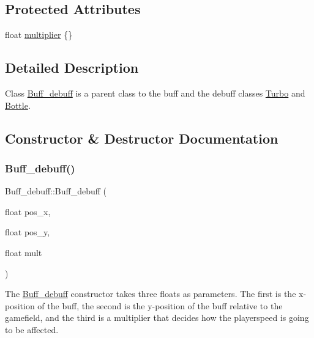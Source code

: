 \subsection*{Protected Attributes}
\begin{DoxyCompactItemize}
\item 
float \hyperlink{classBuff__debuff_a0be49a0b6f19cb7cc160edad75109187}{multiplier} \{\}
\end{DoxyCompactItemize}


\subsection{Detailed Description}
Class \hyperlink{classBuff__debuff}{Buff\+\_\+debuff} is a parent class to the buff and the debuff classes \hyperlink{classTurbo}{Turbo} and \hyperlink{classBottle}{Bottle}. 

\subsection{Constructor \& Destructor Documentation}
\mbox{\label{classBuff__debuff_a7548567887d6e7f2280d488c800a098b}} 
\subsubsection{\texorpdfstring{Buff\+\_\+debuff()}{Buff\_debuff()}}
{\footnotesize\ttfamily Buff\+\_\+debuff\+::\+Buff\+\_\+debuff (\begin{DoxyParamCaption}\item[{float}]{pos\+\_\+x,  }\item[{float}]{pos\+\_\+y,  }\item[{float}]{mult }\end{DoxyParamCaption})}

The \hyperlink{classBuff__debuff}{Buff\+\_\+debuff} constructor takes three floats as parameters. The first is the x-\/position of the buff, the second is the y-\/position of the buff relative to the gamefield, and the third is a multiplier that decides how the playerspeed is going to be affected. \mbox{\label{classBuff__debuff_a86ea03d85641f61757f121c6e226fafc}} 
